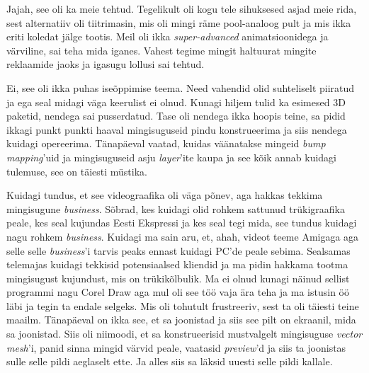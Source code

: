 
Jajah, see oli ka meie tehtud. Tegelikult oli kogu tele  sihuksesed asjad meie rida, sest  alternatiiv oli tiitrimasin, mis oli mingi räme pool-analoog pult ja mis ikka eriti koledat jälge tootis. Meil oli ikka \emph{super-advanced} animatsioonidega ja värviline, sai teha mida iganes. Vahest tegime mingit haltuurat mingite reklaamide jaoks ja igasugu lollusi sai tehtud.


Ei, see oli ikka puhas iseõppimise teema. Need vahendid olid suhteliselt piiratud ja ega seal midagi väga keerulist ei olnud. Kunagi hiljem tulid ka esimesed 3D paketid, nendega sai pusserdatud. Tase oli nendega ikka hoopis teine, sa pidid ikkagi punkt punkti haaval mingisuguseid pindu konstrueerima ja siis nendega kuidagi opereerima. Tänapäeval vaatad, kuidas väänatakse mingeid \emph{bump mapping}'uid  ja mingisuguseid asju \emph{layer}'ite kaupa ja see kõik annab kuidagi tulemuse,  see on täiesti müstika. 


Kuidagi tundus, et see videograafika oli  väga põnev, aga hakkas tekkima mingisugune \emph{business}. Sõbrad, kes kuidagi olid rohkem sattunud trükigraafika peale, kes seal kujundas Eesti Ekspressi ja kes seal tegi mida, see tundus kuidagi nagu rohkem \emph{business}. Kuidagi ma sain aru, et, ahah, videot teeme Amigaga aga selle selle \emph{business}'i tarvis peaks ennast kuidagi PC'de peale  sebima. Sealsamas telemajas kuidagi tekkisid potensiaalsed kliendid ja ma pidin hakkama tootma mingisugust kujundust, mis on  trükikõlbulik. Ma ei olnud  kunagi näinud sellist programmi nagu Corel Draw aga mul oli see töö vaja  ära teha ja ma istusin öö läbi ja tegin ta endale selgeks. Mis oli tohutult frustreeriv, sest ta oli täiesti teine maailm. Tänapäeval on ikka see, et sa joonistad ja siis see pilt on  ekraanil, mida sa joonistad. Siis oli niimoodi, et sa  konstrueerisid mustvalgelt mingisuguse \emph{vector mesh}'i, panid sinna mingid värvid peale, vaatasid \emph{preview}'d ja siis ta joonistas sulle selle pildi aeglaselt ette. Ja alles siis sa läksid uuesti selle pildi kallale.

